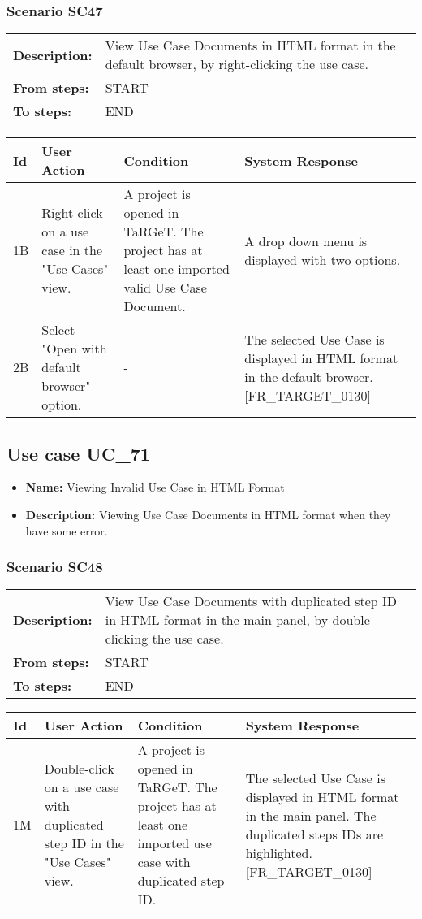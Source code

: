 \documentclass[a4paper,11pt]{article}
\newcommand{\bl}{\\ \hline}
\begin{document}
\subsubsection*{Scenario SC47}
\begin{tabular}{p{1in}p{4in}}
{\bf Description:} & View Use Case Documents in HTML format in the default
					browser, by right-clicking the use case. \\
{\bf From steps:} & START \\
{\bf To steps:} & END \\
\end{tabular}
 
\begin{tabular}{|p{0.8in}|p{1.6in}|p{1.6in}|p{1.6in}|}
\hline
Id & User Action & Condition & System Response  \bl 
1B & Right-click on a use case in the "Use Cases" view. & A project is opened in TaRGeT. The project has at least
						one imported valid Use Case Document. & A drop down menu is displayed with two options.
					 \bl 
2B & Select "Open with default browser" option. & - & The selected Use Case is displayed in HTML format in the
						default browser. [FR_TARGET_0130]  \bl 
\end{tabular}
\subsection*{Use case UC_71}
\begin{itemize}
\item {\bf Name: }Viewing Invalid Use Case in HTML Format
\item {\bf Description: }Viewing Use Case Documents in HTML format when they have
				some error.
\end{itemize}
\subsubsection*{Scenario SC48}
\begin{tabular}{p{1in}p{4in}}
{\bf Description:} & View Use Case Documents with duplicated step ID in HTML
					format in the main panel, by double-clicking the use case.
				 \\
{\bf From steps:} & START \\
{\bf To steps:} & END \\
\end{tabular}
 
\begin{tabular}{|p{0.8in}|p{1.6in}|p{1.6in}|p{1.6in}|}
\hline
Id & User Action & Condition & System Response  \bl 
1M & Double-click on a use case with duplicated step ID in the
						"Use Cases" view.  & A project is opened in TaRGeT. The project has at least
						one imported use case with duplicated step ID.  & The selected Use Case is displayed in HTML format in the
						main panel. The duplicated steps IDs are highlighted.
						[FR_TARGET_0130] \bl 
\end{tabular}
\end{document}

